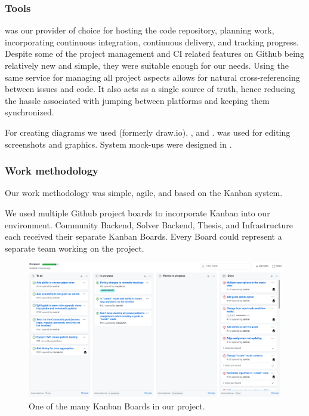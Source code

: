 \subsubsection{Tools}

 was our provider of choice for hosting the code repository, planning work, incorporating continuous integration, continuous delivery, and tracking progress. Despite some of the project management  and CI related features on Github being relatively new and simple, they were suitable enough for our needs. Using the same service for managing all project aspects allows for natural cross-referencing between issues and code. It also acts as a single source of truth, hence reducing the hassle associated with jumping between platforms and keeping them synchronized. 

For creating diagrams we used  (formerly draw.io), , and .  was used for editing screenshots and graphics. System mock-ups were designed in .

\subsubsection{Work methodology}

Our work methodology was simple, agile, and based on the Kanban system.

\medskip
We used multiple Github project boards to incorporate Kanban into our environment. 
Community Backend, Solver Backend, Thesis, and Infrastructure each received their separate Kanban Boards. Every Board could represent a separate team working on the project.

\begin{figure}[H]
  \caption{One of the many Kanban Boards in our project.}
  \centering
  \includegraphics[width=\textwidth]{assets/4-gh-board.png}
\end{figure}

